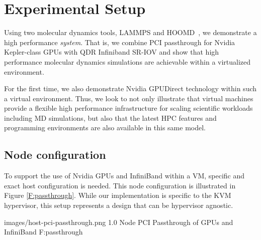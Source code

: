 



\section{Experimental Setup}

Using two molecular dynamics tools, LAMMPS\cite{plimpton2007lammps} and HOOMD~\cite{anderson2010hoomd}, we demonstrate a high performance \textit{system}.  That is, we combine PCI passthrough for Nvidia Kepler-class GPUs with QDR Infiniband SR-IOV and show that high performance molecular dynamics simulations are achievable within a virtualized environment. 

For the first time, we also demonstrate Nvidia GPUDirect technology within such a virtual environment.  Thus, we look to not only illustrate that virtual machines provide a flexible high performance infrastructure for scaling scientific workloads including MD simulations, but also that the latest HPC features and programming environments are also available in this same model.   

\subsection{Node configuration}

To support the use of Nvidia GPUs and InfiniBand within a VM, specific and exact host configuration is needed. This node configuration is illustrated in Figure \ref{F:passthrough}.  While our implementation is specific to the KVM hypervisor, this setup represents a design that can be hypervisor agnostic.

  {images/host-pci-passthrough.png}
  {1.0}
  {Node PCI Passthrough of GPUs and InfiniBand}
  {F:passthrough}


